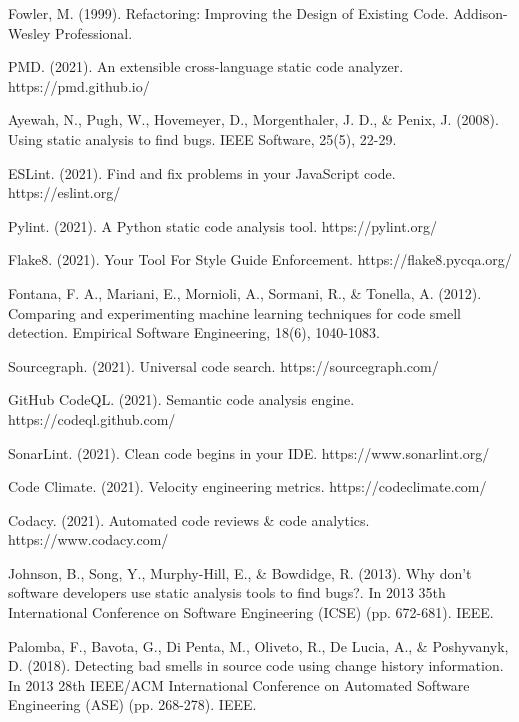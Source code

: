 \documentclass[sigconf,screen]{acmart}
\begin{document}
\balance

\begin{thebibliography}{00}
 Fowler, M. (1999). Refactoring: Improving the Design of Existing Code. Addison-Wesley Professional.

 PMD. (2021). An extensible cross-language static code analyzer. https://pmd.github.io/

 Ayewah, N., Pugh, W., Hovemeyer, D., Morgenthaler, J. D., \& Penix, J. (2008). Using static analysis to find bugs. IEEE Software, 25(5), 22-29.

 ESLint. (2021). Find and fix problems in your JavaScript code. https://eslint.org/

 Pylint. (2021). A Python static code analysis tool. https://pylint.org/

 Flake8. (2021). Your Tool For Style Guide Enforcement. https://flake8.pycqa.org/

 Fontana, F. A., Mariani, E., Mornioli, A., Sormani, R., \& Tonella, A. (2012). Comparing and experimenting machine learning techniques for code smell detection. Empirical Software Engineering, 18(6), 1040-1083.

 Sourcegraph. (2021). Universal code search. https://sourcegraph.com/

 GitHub CodeQL. (2021). Semantic code analysis engine. https://codeql.github.com/

 SonarLint. (2021). Clean code begins in your IDE. https://www.sonarlint.org/

 Code Climate. (2021). Velocity engineering metrics. https://codeclimate.com/

 Codacy. (2021). Automated code reviews \& code analytics. https://www.codacy.com/

 Johnson, B., Song, Y., Murphy-Hill, E., \& Bowdidge, R. (2013). Why don't software developers use static analysis tools to find bugs?. In 2013 35th International Conference on Software Engineering (ICSE) (pp. 672-681). IEEE.

 Palomba, F., Bavota, G., Di Penta, M., Oliveto, R., De Lucia, A., \& Poshyvanyk, D. (2018). Detecting bad smells in source code using change history information. In 2013 28th IEEE/ACM International Conference on Automated Software Engineering (ASE) (pp. 268-278). IEEE.


\end{thebibliography}
\end{document}

